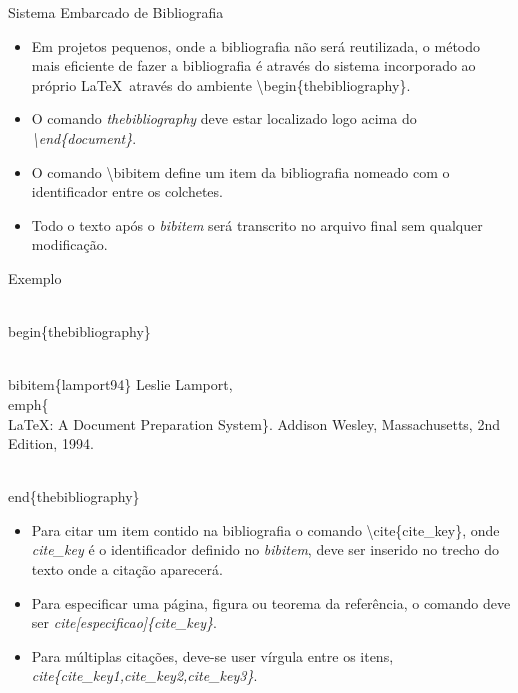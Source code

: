 \begin{frame}{Sistema Embarcado de Bibliografia}

  \begin{itemize}
    \item Em projetos pequenos, onde a bibliografia não será reutilizada, o método mais eficiente de fazer a bibliografia
    é através do sistema incorporado ao próprio \LaTeX\ através do ambiente \alert{\textbackslash begin\{thebibliography\}}.    
    \item O comando \textit{thebibliography} deve estar localizado logo acima do \textit{\textbackslash end\{document\}}.
    \item O comando \alert{\textbackslash bibitem} define um item da bibliografia nomeado com o identificador entre os colchetes.
    \item Todo o texto após o \textit{bibitem} será transcrito no arquivo final sem qualquer modificação.
  \end{itemize}

  \begin{exampleblock}{Exemplo}
  \begin{semiverbatim}
    \\begin\{thebibliography\}
    
    \\bibitem\{lamport94\}
      Leslie Lamport,
      \\emph\{\\LaTeX: A Document Preparation System\}.
      Addison Wesley, Massachusetts,
      2nd Edition,
      1994.

    \\end\{thebibliography\}
  \end{semiverbatim}
  \end{exampleblock}

    \newpage

  \begin{itemize}
   \item Para citar um item contido na bibliografia o comando \alert{\textbackslash cite\{cite\_key\}}, onde \textit{cite\_key} é o 
   identificador definido no \textit{bibitem}, deve ser inserido no trecho do texto onde a citação aparecerá.
   \item Para especificar uma página, figura ou teorema da referência, o comando deve ser \textit{cite[especificao]\{cite\_key\}}.
   \item Para múltiplas citações, deve-se user vírgula entre os itens, \textit{cite\{cite\_key1,cite\_key2,cite\_key3\}}.    
  \end{itemize}
 
\end{frame}


